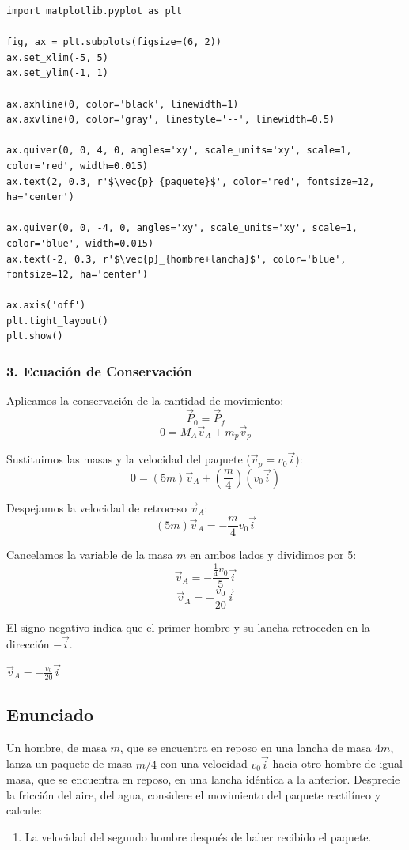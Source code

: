 \documentclass[12pt, a4paper]{article}
\begin{document}
\begin{lstlisting}
import matplotlib.pyplot as plt

fig, ax = plt.subplots(figsize=(6, 2))
ax.set_xlim(-5, 5)
ax.set_ylim(-1, 1)

ax.axhline(0, color='black', linewidth=1)
ax.axvline(0, color='gray', linestyle='--', linewidth=0.5)

ax.quiver(0, 0, 4, 0, angles='xy', scale_units='xy', scale=1, color='red', width=0.015)
ax.text(2, 0.3, r'$\vec{p}_{paquete}$', color='red', fontsize=12, ha='center')

ax.quiver(0, 0, -4, 0, angles='xy', scale_units='xy', scale=1, color='blue', width=0.015)
ax.text(-2, 0.3, r'$\vec{p}_{hombre+lancha}$', color='blue', fontsize=12, ha='center')

ax.axis('off')
plt.tight_layout()
plt.show()
\end{lstlisting}

\subsubsection*{3. Ecuación de Conservación}
Aplicamos la conservación de la cantidad de movimiento:
\[ \vec{P}_0 = \vec{P}_f \]
\[ 0 = M_A \vec{v}_A + m_p \vec{v}_p \]

Sustituimos las masas y la velocidad del paquete ($\vec{v}_p = v_0\vec{i}$):
\[ 0 = (5m) \vec{v}_A + \left(\frac{m}{4}\right) (v_0\vec{i}) \]

Despejamos la velocidad de retroceso $\vec{v}_A$:
\[ (5m) \vec{v}_A = - \frac{m}{4} v_0\vec{i} \]

Cancelamos la variable de la masa $m$ en ambos lados y dividimos por 5:
\[ \vec{v}_A = - \frac{\frac{1}{4} v_0}{5} \vec{i} \]
\[ \vec{v}_A = - \frac{v_0}{20} \vec{i} \]

El signo negativo indica que el primer hombre y su lancha retroceden en la dirección $-\vec{i}$.

\begin{tcolorbox}[colback=green!5!white, colframe=green!50!black, title=Respuesta Final]
\centering \Large $\vec{v}_A = - \frac{v_0}{20} \vec{i}$
\end{tcolorbox}

\newpage

\subsection*{Enunciado}
Un hombre, de masa $m$, que se encuentra en reposo en una lancha de masa $4m$, lanza un paquete de masa $m/4$ con una velocidad $v_0\vec{i}$ hacia otro hombre de igual masa, que se encuentra en reposo, en una lancha idéntica a la anterior. Desprecie la fricción del aire, del agua, considere el movimiento del paquete rectilíneo y calcule:
\begin{enumerate}[label=\alph*), start=2]
    \item La velocidad del segundo hombre después de haber recibido el paquete.
\end{enumerate}
\end{document}
